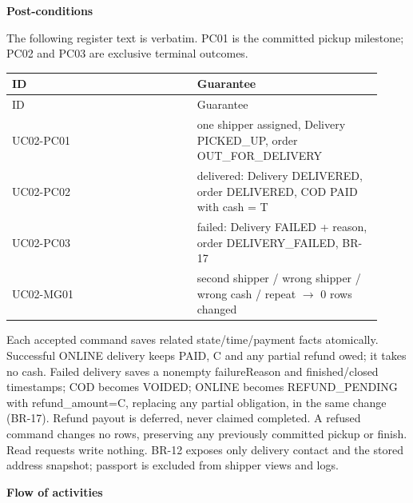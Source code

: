 \textbf{Post-conditions}

The following register text is verbatim. PC01 is the committed pickup milestone; PC02 and PC03 are exclusive terminal outcomes.

\begin{longtable}{>{\raggedright\arraybackslash}p{0.4600\linewidth}>{\raggedright\arraybackslash}p{0.4600\linewidth}}
ID & Guarantee \\
\hline\endfirsthead
ID & Guarantee \\
\hline\endhead
UC02-PC01 & one shipper assigned, Delivery PICKED\_UP, order OUT\_FOR\_DELIVERY \\
UC02-PC02 & delivered: Delivery DELIVERED, order DELIVERED, COD PAID with cash = T \\
UC02-PC03 & failed: Delivery FAILED + reason, order DELIVERY\_FAILED, BR-17 \\
UC02-MG01 & second shipper / wrong shipper / wrong cash / repeat \ensuremath{\rightarrow} 0 rows changed \\
\end{longtable}
Each accepted command saves related state/time/payment facts atomically. Successful ONLINE delivery keeps PAID, C and any partial refund owed; it takes no cash. Failed delivery saves a nonempty failureReason and finished/closed timestamps; COD becomes VOIDED; ONLINE becomes REFUND\_PENDING with refund\_amount=C, replacing any partial obligation, in the same change (BR-17). Refund payout is deferred, never claimed completed. A refused command changes no rows, preserving any previously committed pickup or finish. Read requests write nothing. BR-12 exposes only delivery contact and the stored address snapshot; passport is excluded from shipper views and logs.

\textbf{Flow of activities}

